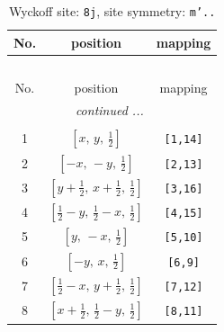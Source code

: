 \documentclass[fleqn,8pt]{jsarticle}
\begin{document}
\begin{longtable}{ccc}
\caption{Wyckoff site: {\tt 8j}, site symmetry: {\tt m'..}}
 \\
 \hline \hline
No. & position & mapping \\ \hline \endfirsthead

\multicolumn{2}{l}{\tablename\ \thetable{}} \\
 \hline \hline
No. & position & mapping \\ \hline \endhead

 \hline \hline
\multicolumn{2}{r}{\footnotesize\it continued ...} \\ \endfoot

 \hline \hline
\multicolumn{2}{r}{} \\ \endlastfoot

1 & $\left[ x,\, y,\, \frac{1}{2} \right]$ & {\tt [1,14]} \\ \hline
2 & $\left[ - x,\, - y,\, \frac{1}{2} \right]$ & {\tt [2,13]} \\ \hline
3 & $\left[ y + \frac{1}{2},\, x + \frac{1}{2},\, \frac{1}{2} \right]$ & {\tt [3,16]} \\ \hline
4 & $\left[ \frac{1}{2} - y,\, \frac{1}{2} - x,\, \frac{1}{2} \right]$ & {\tt [4,15]} \\ \hline
5 & $\left[ y,\, - x,\, \frac{1}{2} \right]$ & {\tt [5,10]} \\ \hline
6 & $\left[ - y,\, x,\, \frac{1}{2} \right]$ & {\tt [6,9]} \\ \hline
7 & $\left[ \frac{1}{2} - x,\, y + \frac{1}{2},\, \frac{1}{2} \right]$ & {\tt [7,12]} \\ \hline
8 & $\left[ x + \frac{1}{2},\, \frac{1}{2} - y,\, \frac{1}{2} \right]$ & {\tt [8,11]} \\
\end{longtable}
\renewcommand{\arraystretch}{1.2}
\end{document}

